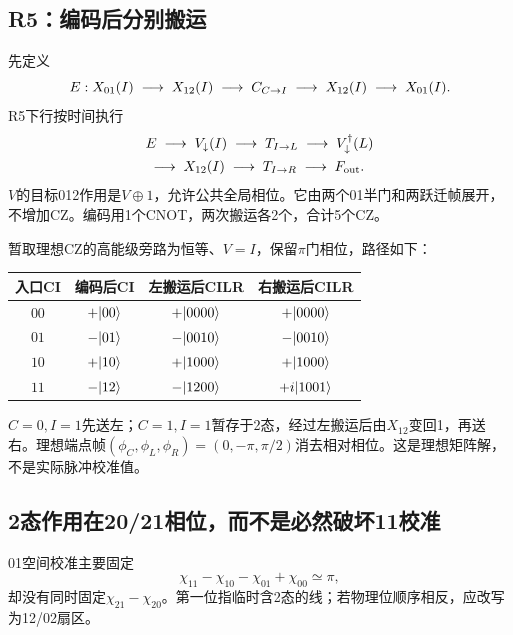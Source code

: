 \subsection{R5：编码后分别搬运}
先定义
\begin{equation}\label{eq:encoder}
 E:X_{01}(I)\;\longrightarrow\; X_{12}(I)\;\longrightarrow\; C_{C\to I}\;\longrightarrow\; X_{12}(I)\;\longrightarrow\; X_{01}(I).
\end{equation}
R5下行按时间执行
\begin{equation}\label{eq:r5down}
\begin{aligned}
 &E\;\longrightarrow\; V_{\downarrow}(I)\;\longrightarrow\; T_{I\to L}\;\longrightarrow\; V_{\downarrow}^{\dagger}(L)\\
 &\;\longrightarrow\; X_{12}(I)\;\longrightarrow\; T_{I\to R}\;\longrightarrow\; F_{\rm out}.
\end{aligned}
\end{equation}
$V$的目标012作用是$V\oplus1$，允许公共全局相位。它由两个01半门和两跃迁帧展开，不增加CZ。编码用1个CNOT，两次搬运各2个，合计5个CZ。

暂取理想CZ的高能级旁路为恒等、$V=I$，保留$\pi$门相位，路径如下：
\begin{center}\small\begin{tabular}{@{}cccc@{}}\toprule
入口CI & 编码后CI & 左搬运后CILR & 右搬运后CILR\\\midrule
$00$ & $+\lvert 00\rangle$ & $+\lvert 0000\rangle$ & $+\lvert 0000\rangle$\\
$01$ & $-\lvert 01\rangle$ & $-\lvert 0010\rangle$ & $-\lvert 0010\rangle$\\
$10$ & $+\lvert 10\rangle$ & $+\lvert 1000\rangle$ & $+\lvert 1000\rangle$\\
$11$ & $-\lvert 12\rangle$ & $-\lvert 1200\rangle$ & $+i\lvert 1001\rangle$\\\bottomrule
\end{tabular}\end{center}
$C=0,I=1$先送左；$C=1,I=1$暂存于2态，经过左搬运后由$X_{12}$变回1，再送右。理想端点帧$(\phi_C,\phi_L,\phi_R)=(0,-\pi,\pi/2)$消去相对相位。这是理想矩阵解，不是实际脉冲校准值。

\subsection{2态作用在20/21相位，而不是必然破坏11校准}
01空间校准主要固定
\begin{equation}
 \chi_{11}-\chi_{10}-\chi_{01}+\chi_{00}\simeq\pi,
\end{equation}
却没有同时固定$\chi_{21}-\chi_{20}$。第一位指临时含2态的线；若物理位顺序相反，应改写为12/02扇区。

